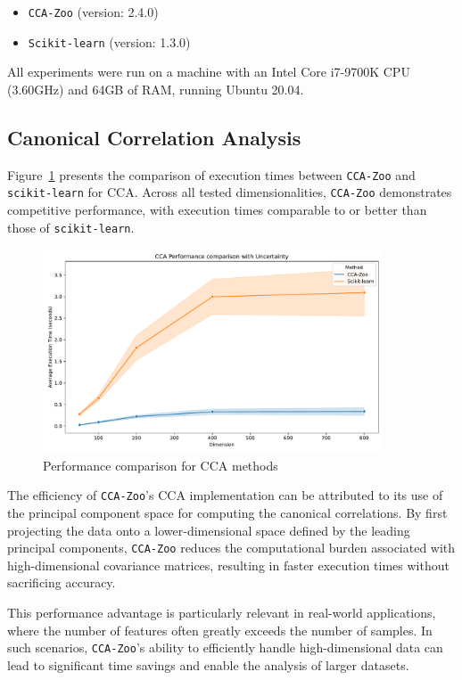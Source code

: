 \begin{itemize}
\item \texttt{CCA-Zoo} (version: 2.4.0)
\item \texttt{Scikit-learn} (version: 1.3.0)
\end{itemize}

All experiments were run on a machine with an Intel Core i7-9700K CPU (3.60GHz) and 64GB of RAM, running Ubuntu 20.04.

\subsection{Canonical Correlation Analysis}

Figure~\ref{fig:cca_benchmark} presents the comparison of execution times between \texttt{CCA-Zoo} and \texttt{scikit-learn} for CCA. Across all tested dimensionalities, \texttt{CCA-Zoo} demonstrates competitive performance, with execution times comparable to or better than those of \texttt{scikit-learn}.

\begin{figure}[h]
\centering
\includegraphics[width=0.9\textwidth]{figures/CCA_Speed_Benchmark}
\caption{Performance comparison for CCA methods}
\label{fig:cca_benchmark}
\end{figure}

The efficiency of \texttt{CCA-Zoo}'s CCA implementation can be attributed to its use of the principal component space for computing the canonical correlations. By first projecting the data onto a lower-dimensional space defined by the leading principal components, \texttt{CCA-Zoo} reduces the computational burden associated with high-dimensional covariance matrices, resulting in faster execution times without sacrificing accuracy.

This performance advantage is particularly relevant in real-world applications, where the number of features often greatly exceeds the number of samples. In such scenarios, \texttt{CCA-Zoo}'s ability to efficiently handle high-dimensional data can lead to significant time savings and enable the analysis of larger datasets.

